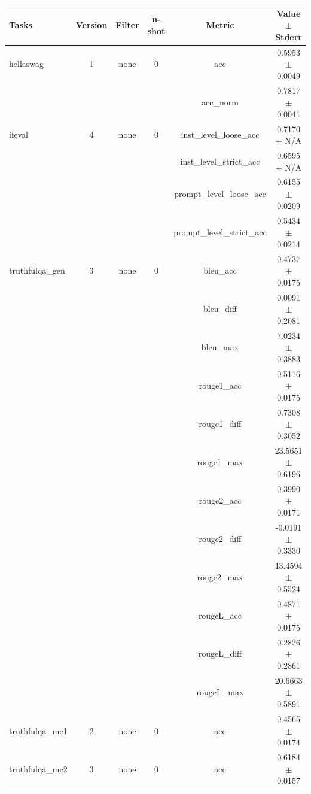 \documentclass{ifacconf}
\begin{document}
\begin{minipage}{\textwidth}
    \begin{table}[H]
    \centering
    \begin{tabular}{|l|c|c|c|c|c|}
    \hline
    \textbf{Tasks} & \textbf{Version} & \textbf{Filter} & \textbf{n-shot} & \textbf{Metric} & \textbf{Value} $\pm$ \textbf{Stderr} \\ \hline
    hellaswag & 1 & none & 0 & acc & 0.5953 $\pm$ 0.0049 \\ \hline
    & & & & acc\_norm & 0.7817 $\pm$ 0.0041 \\ \hline
    ifeval & 4 & none & 0 & inst\_level\_loose\_acc & 0.7170 $\pm$ N/A \\ \hline
    & & & & inst\_level\_strict\_acc & 0.6595 $\pm$ N/A \\ \hline
    & & & & prompt\_level\_loose\_acc & 0.6155 $\pm$ 0.0209 \\ \hline
    & & & & prompt\_level\_strict\_acc & 0.5434 $\pm$ 0.0214 \\ \hline
    truthfulqa\_gen & 3 & none & 0 & bleu\_acc & 0.4737 $\pm$ 0.0175 \\ \hline
    & & & & bleu\_diff & 0.0091 $\pm$ 0.2081 \\ \hline
    & & & & bleu\_max & 7.0234 $\pm$ 0.3883 \\ \hline
    & & & & rouge1\_acc & 0.5116 $\pm$ 0.0175 \\ \hline
    & & & & rouge1\_diff & 0.7308 $\pm$ 0.3052 \\ \hline
    & & & & rouge1\_max & 23.5651 $\pm$ 0.6196 \\ \hline
    & & & & rouge2\_acc & 0.3990 $\pm$ 0.0171 \\ \hline
    & & & & rouge2\_diff & -0.0191 $\pm$ 0.3330 \\ \hline
    & & & & rouge2\_max & 13.4594 $\pm$ 0.5524 \\ \hline
    & & & & rougeL\_acc & 0.4871 $\pm$ 0.0175 \\ \hline
    & & & & rougeL\_diff & 0.2826 $\pm$ 0.2861 \\ \hline
    & & & & rougeL\_max & 20.6663 $\pm$ 0.5891 \\ \hline
    truthfulqa\_mc1 & 2 & none & 0 & acc & 0.4565 $\pm$ 0.0174 \\ \hline
    truthfulqa\_mc2 & 3 & none & 0 & acc & 0.6184 $\pm$ 0.0157 \\ \hline
    \end{tabular}
    \label{tab:qwen25_vptq}
    \end{table}
\end{minipage}
\end{document}
